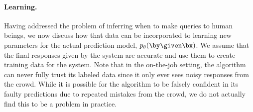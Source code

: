 \paragraph{Learning.}
Having addressed the problem of inferring when to make queries to human beings, we now discuss how that data can be incorporated to learning new parameters for the actual prediction model, $p_\theta(\by \given \bx)$.
We assume that the final responses given by the system are accurate and use them to create training data for the system.
Note that in the on-the-job setting, the algorithm can never fully trust its labeled data since it only ever sees noisy responses from the crowd.
While it is possible for the algorithm to be falsely confident in its faulty predictions due to repeated mistakes from the crowd, we do not actually find this to be a problem in practice.



